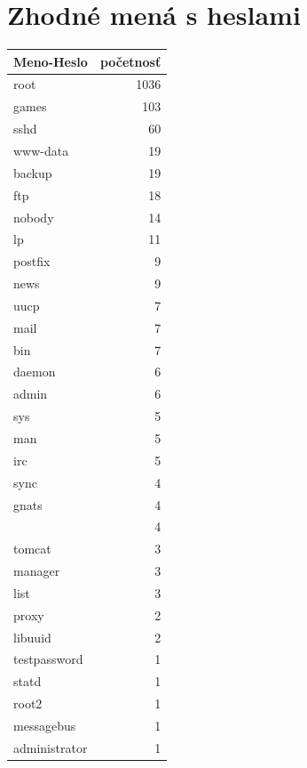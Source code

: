 \documentclass[12pt, oneside]{book}
\begin{document}
\section*{Zhodné mená s heslami}
\tiny
\begin{longtable}{|l|r|}
\hline
Meno-Heslo&početnosť\\
\hline
root&1036\\ 
games&103\\ 
sshd&60\\ 
www-data&19\\ 
backup&19\\ 
ftp&18\\ 
nobody&14\\ 
lp&11\\ 
postfix&9\\ 
news&9\\ 
uucp&7\\ 
mail&7\\ 
bin&7\\ 
daemon&6\\ 
admin&6\\ 
sys&5\\ 
man&5\\ 
irc&5\\ 
sync&4\\ 
gnats&4\\ 
&4\\ 
tomcat&3\\ 
manager&3\\ 
list&3\\ 
proxy&2\\ 
libuuid&2\\ 
testpassword&1\\ 
statd&1\\ 
root2&1\\ 
messagebus&1\\ 
administrator&1\\

\hline
\end{longtable}
	 
\newpage	
\thispagestyle{empty}
\end{document}
